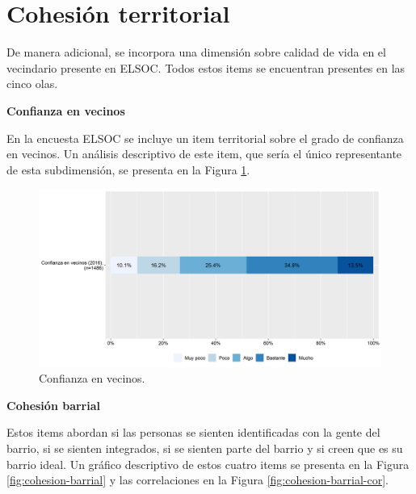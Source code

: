 \documentclass[
  12pt,
]{book}
\begin{document}
\hypertarget{cohesiuxf3n-territorial}{%
\section{Cohesión territorial}\label{cohesiuxf3n-territorial}}

De manera adicional, se incorpora una dimensión sobre calidad de vida en el vecindario presente en ELSOC. Todos estos items se encuentran presentes en las cinco olas.

\textbf{Confianza en vecinos}

En la encuesta ELSOC se incluye un item territorial sobre el grado de confianza en vecinos. Un análisis descriptivo de este item, que sería el único representante de esta subdimensión, se presenta en la Figura \ref{fig:confianza-vecinos}.

\begin{figure}[H]

{\centering \includegraphics[width=1\linewidth,height=1\textheight]{output/graphs/confianza-vecinos} 

}

\caption{Confianza en vecinos.}\label{fig:confianza-vecinos}
\end{figure}

\textbf{Cohesión barrial}

Estos items abordan si las personas se sienten identificadas con la gente del barrio, si se sienten integrados, si se sienten parte del barrio y si creen que es su barrio ideal. Un gráfico descriptivo de estos cuatro items se presenta en la Figura \ref{fig:cohesion-barrial} y las correlaciones en la Figura \ref{fig:cohesion-barrial-cor}.
\end{document}
